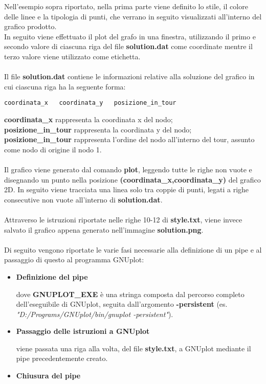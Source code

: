 Nell'esempio sopra riportato, nella prima parte viene definito lo stile, il colore delle linee e la tipologia di punti, che verrano in seguito visualizzati all'interno del grafico prodotto.\\In seguito viene effettuato il plot del grafo in una finestra, utilizzando il primo e secondo valore di ciascuna riga del file \textbf{solution.dat} come coordinate mentre il terzo valore viene utilizzato come etichetta.\\\\
Il file \textbf{solution.dat} contiene le informazioni relative alla soluzione del grafico in cui ciascuna riga ha la seguente forma:
\begin{lstlisting}[linewidth=290pt,basicstyle=\footnotesize\sffamily,]     
coordinata_x   coordinata_y   posizione_in_tour
\end{lstlisting}
\textbf{coordinata\_x} rappresenta la coordinata x del nodo;\\
\textbf{posizione\_in\_tour} rappresenta la coordinata y del nodo;\\
\textbf{posizione\_in\_tour} rappresenta l'ordine del nodo all'interno del tour, assunto come nodo di origine il nodo 1.\\\\
Il grafico viene generato dal comando \textbf{plot}, leggendo tutte le righe non vuote e disegnando un punto nella posizione \textbf{(coordinata\_x,coordinata\_y)} del grafico 2D. In seguito viene tracciata una linea solo tra coppie di punti, legati a righe consecutive non vuote all'interno di \textbf{solution.dat}.\\\\
Attraverso le istruzioni riportate nelle righe 10-12 di \textbf{style.txt}, viene invece salvato il grafico appena generato nell'immagine \textbf{solution.png}.\\\\
Di seguito vengono riportate le varie fasi necessarie alla definizione di un pipe e al passaggio di questo al programma GNUplot:
\begin{itemize}
\item{\textbf{Definizione del pipe}

dove \textbf{GNUPLOT\_EXE} è una stringa composta dal percorso completo dell'eseguibile di GNUplot, seguita dall'argomento \textbf{-persistent} (es. \textit{"D:/Programs/GNUplot/bin/gnuplot -persistent"}).
}
\item{\textbf{Passaggio delle istruzioni a GNUplot}

viene passata una riga alla volta, del file \textbf{style.txt}, a GNUplot mediante il pipe precedentemente creato.
}
\item{\textbf{Chiusura del pipe}

}
\end{itemize}